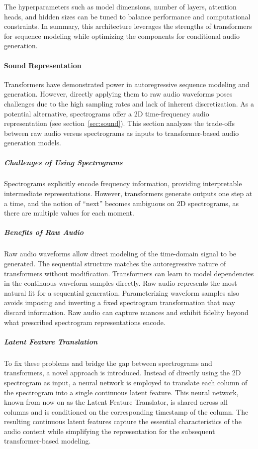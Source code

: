 The hyperparameters such as model dimensions, number of layers, attention heads, and hidden sizes can be tuned to balance performance and computational constraints. In summary, this architecture leverages the strengths of transformers for sequence modeling while optimizing the components for conditional audio generation.

\paragraph{Sound Representation}
Transformers have demonstrated power in autoregressive sequence modeling and generation. However, directly applying them to raw audio waveforms poses challenges due to the high sampling rates and lack of inherent discretization. As a potential alternative, spectrograms offer a 2D time-frequency audio representation (see section~\ref{sec:sound}). This section analyzes the trade-offs between raw audio versus spectrograms as inputs to transformer-based audio generation models.

\subparagraph{Challenges of Using Spectrograms}
Spectrograms explicitly encode frequency information, providing interpretable intermediate representations. However, transformers generate outputs one step at a time, and the notion of ``next'' becomes ambiguous on 2D spectrograms, as there are multiple values for each moment.

\subparagraph{Benefits of Raw Audio}
Raw audio waveforms allow direct modeling of the time-domain signal to be generated. The sequential structure matches the autoregressive nature of transformers without modification. Transformers can learn to model dependencies in the continuous waveform samples directly.
Raw audio represents the most natural fit for a sequential generation. Parameterizing waveform samples also avoids imposing and inverting a fixed spectrogram transformation that may discard information. Raw audio can capture nuances and exhibit fidelity beyond what prescribed spectrogram representations encode.

\subparagraph{Latent Feature Translation}
To fix these problems and bridge the gap between spectrograms and transformers, a novel approach is introduced. Instead of directly using the 2D spectrogram as input, a neural network is employed to translate each column of the spectrogram into a single continuous latent feature. This neural network, known from now on as the Latent Feature Translator, is shared across all columns and is conditioned on the corresponding timestamp of the column. The resulting continuous latent features capture the essential characteristics of the audio content while simplifying the representation for the subsequent transformer-based modeling.

